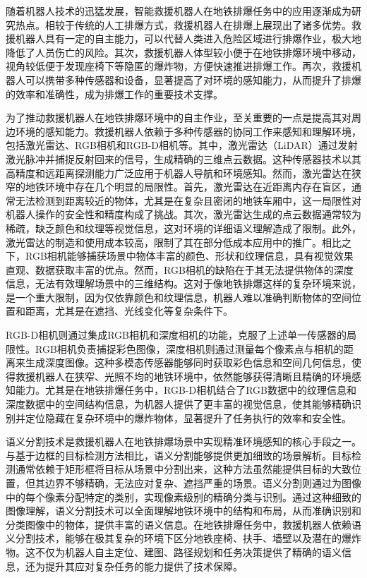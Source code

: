 随着机器人技术的迅猛发展，智能救援机器人在地铁排爆任务中的应用逐渐成为研究热点。相较于传统的人工排爆方式，救援机器人在排爆上展现出了诸多优势。救援机器人具有一定的自主能力，可以代替人类进入危险区域进行排爆作业，极大地降低了人员伤亡的风险。其次，救援机器人体型较小便于在地铁排爆环境中移动，视角较低便于发现座椅下等隐匿的爆炸物，方便快速推进排爆工作。再次，救援机器人可以携带多种传感器和设备，显著提高了对环境的感知能力，从而提升了排爆的效率和准确性，成为排爆工作的重要技术支撑。

为了推动救援机器人在地铁排爆环境中的自主作业，至关重要的一点是提高其对周边环境的感知能力。救援机器人依赖于多种传感器的协同工作来感知和理解环境，包括激光雷达、RGB相机和RGB-D相机等。其中，激光雷达（LiDAR）通过发射激光脉冲并捕捉反射回来的信号，生成精确的三维点云数据。这种传感器技术以其高精度和远距离探测能力广泛应用于机器人导航和环境感知。然而，激光雷达在狭窄的地铁环境中存在几个明显的局限性。首先，激光雷达在近距离内存在盲区，通常无法检测到距离较近的物体，尤其是在复杂且密闭的地铁车厢中，这一局限性对机器人操作的安全性和精度构成了挑战。其次，激光雷达生成的点云数据通常较为稀疏，缺乏颜色和纹理等视觉信息，这对环境的详细语义理解造成了限制。此外，激光雷达的制造和使用成本较高，限制了其在部分低成本应用中的推广。相比之下，RGB相机能够捕获场景中物体丰富的颜色、形状和纹理信息，具有视觉效果直观、数据获取丰富的优点。然而，RGB相机的缺陷在于其无法提供物体的深度信息，无法有效理解场景中的三维结构。这对于像地铁排爆这样的复杂环境来说，是一个重大限制，因为仅依靠颜色和纹理信息，机器人难以准确判断物体的空间位置和距离，尤其是在遮挡、光线变化等复杂条件下。

RGB-D相机则通过集成RGB相机和深度相机的功能，克服了上述单一传感器的局限性。RGB相机负责捕捉彩色图像，深度相机则通过测量每个像素点与相机的距离来生成深度图像。这种多模态传感器能够同时获取彩色信息和空间几何信息，使得救援机器人在狭窄、光照不均的地铁环境中，依然能够获得清晰且精确的环境感知能力。尤其是在地铁排爆任务中，RGB-D相机结合了RGB数据中的纹理信息和深度数据中的空间结构信息，为机器人提供了更丰富的视觉信息，使其能够精确识别并定位隐藏在复杂环境中的爆炸物体，显著提升了任务执行的效率和安全性。

语义分割技术是救援机器人在地铁排爆场景中实现精准环境感知的核心手段之一。与基于边框的目标检测方法相比，语义分割能够提供更加细致的场景解析。目标检测通常依赖于矩形框将目标从场景中分割出来，这种方法虽然能提供目标的大致位置，但其边界不够精确，无法应对复杂、遮挡严重的场景。语义分割则通过为图像中的每个像素分配特定的类别，实现像素级别的精确分类与识别。通过这种细致的图像理解，语义分割技术可以全面理解地铁环境中的结构和布局，从而准确识别和分类图像中的物体，提供丰富的语义信息。在地铁排爆任务中，救援机器人依赖语义分割技术，能够在极其复杂的环境下区分地铁座椅、扶手、墙壁以及潜在的爆炸物。这不仅为机器人自主定位、建图、路径规划和任务决策提供了精确的语义信息，还为提升其应对复杂任务的能力提供了技术保障。

